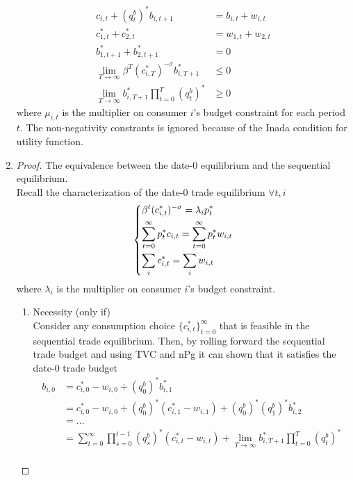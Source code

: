 \documentclass{article}
\begin{document}
\begin{enumerate}
\begin{align}
            c_{i,t}+(q_{t}^b)^\ast b_{i,t+1}&=b_{i,t}+w_{i,t}\tag{B.C}\\
            c_{1,t}^\ast+c_{2,t}^\ast&=w_{1,t}+w_{2,t}\tag{goods}\\
            b_{1,t+1}^\ast+b_{2,t+1}^\ast&=0\tag{asset}\\
            \lim_{T\to\infty}\beta^T(c_{i,T}^\ast)^{-\sigma}b_{i,T+1}^\ast&\le0\tag{TVC}\\
            \lim_{T\to\infty}b_{i,T+1}^\ast\prod_{t=0}^T(q_{t}^b)^\ast&\ge0\tag{nPg}
        \end{align}
        where $\mu_{i,t}$ is the multiplier on consumer $i$'s budget constraint for each period $t$. The non-negativity constrants is ignored because of the Inada condition for utility function. 
        \item \begin{proof}
            The equivalence between the date-0 equilibrium and the sequential equilibrium.\\
            Recall the characterization of the date-0 trade equilibrium $\forall t,i$
            \[\begin{dcases}
                \beta^t (c_{i,t}^\ast)^{-\sigma}=\lambda_ip_t^\ast\\
                \sum_{t=0}^\infty p_t^\ast c_{i,t}=\sum_{t=0}^\infty p_t^\ast w_{i,t}\\
                \sum_i c_{i,t}^\ast=\sum_i w_{i,t}
            \end{dcases}\]
            where $\lambda_i$ is the multiplier on consumer $i$'s budget constraint.
            \begin{enumerate}
                \item Necessity (only if)\\
                Consider any consumption choice \(\{c_{i,t}^\ast\}_{t=0}^\infty\) that is feasible in the sequential trade equilibrium. Then, by rolling forward the sequential trade budget and using TVC and nPg it can shown that it satisfies the date-0 trade budget
                \begin{align*}
                    b_{i,0}&=c_{i,0}^\ast-w_{i,0}+(q_{0}^b)^\ast b_{i,1}^\ast\\
                    &=c_{i,0}^\ast-w_{i,0}+(q_{0}^b)^\ast(c_{i,1}^\ast-w_{i,1})+(q_{0}^b)^\ast(q_{1}^b)^\ast b_{i,2}^\ast\\
                    &=\dots\\
                    &=\sum_{t=0}^\infty\prod_{s=0}^{t-1}(q_{s}^b)^\ast(c_{i,t}^\ast-w_{i,t})+\lim_{T\to\infty}b_{i,T+1}^\ast\prod_{t=0}^T(q_{t}^b)^\ast\\

\end{align*}
\end{enumerate}
\end{proof}
\end{enumerate}
\end{document}
